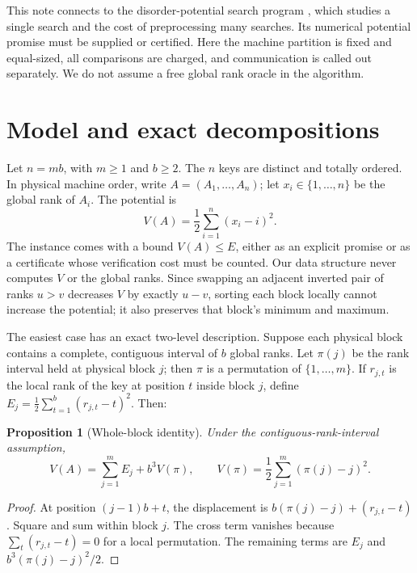 \documentclass[10pt,letterpaper]{article}
\newtheorem{proposition}[theorem]{Proposition}
\begin{document}
This note connects to the disorder-potential search program \cite{landers}, which studies a single search and the cost of preprocessing many searches. Its numerical potential promise must be supplied or certified. Here the machine partition is fixed and equal-sized, all comparisons are charged, and communication is called out separately. We do not assume a free global rank oracle in the algorithm.

\section{Model and exact decompositions}
Let $n=mb$, with $m\ge1$ and $b\ge2$. The $n$ keys are distinct and totally ordered. In physical machine order, write $A=(A_1,\ldots,A_n)$; let $x_i\in\{1,\ldots,n\}$ be the global rank of $A_i$. The potential is
\begin{equation}\label{eq:potential}
 V(A)=\frac12\sum_{i=1}^{n}(x_i-i)^2.
\end{equation}
The instance comes with a bound $V(A)\le E$, either as an explicit promise or as a certificate whose verification cost must be counted. Our data structure never computes $V$ or the global ranks. Since swapping an adjacent inverted pair of ranks $u>v$ decreases $V$ by exactly $u-v$, sorting each block locally cannot increase the potential; it also preserves that block's minimum and maximum.

The easiest case has an exact two-level description. Suppose each physical block contains a complete, contiguous interval of $b$ global ranks. Let $\pi(j)$ be the rank interval held at physical block $j$; then $\pi$ is a permutation of $\{1,\ldots,m\}$. If $r_{j,t}$ is the local rank of the key at position $t$ inside block $j$, define $E_j=\frac12\sum_{t=1}^{b}(r_{j,t}-t)^2$. Then:
\begin{proposition}[Whole-block identity]\label{prop:block}
 Under the contiguous-rank-interval assumption,
 \begin{equation}\label{eq:block}
 V(A)=\sum_{j=1}^{m}E_j+b^3V(\pi),\qquad
 V(\pi)=\frac12\sum_{j=1}^{m}(\pi(j)-j)^2.
 \end{equation}
\end{proposition}
\begin{proof}
At position $(j-1)b+t$, the displacement is $b(\pi(j)-j)+(r_{j,t}-t)$. Square and sum within block $j$. The cross term vanishes because $\sum_t(r_{j,t}-t)=0$ for a local permutation. The remaining terms are $E_j$ and $b^3(\pi(j)-j)^2/2$.
\end{proof}
\end{document}
